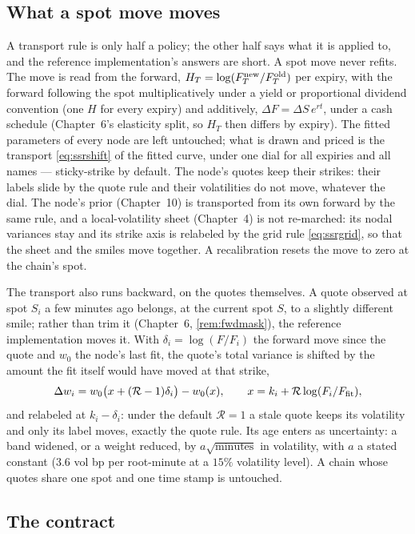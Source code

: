 \subsection{What a spot move moves}
\label{sec:ssrmoves}

A transport rule is only half a policy; the other half says what it
is applied to, and the reference implementation's answers are short.
A spot move never refits.  The move is read from the forward,
$H_T=\log(F_T^{\rm new}/F_T^{\rm old})$ per expiry, with the forward
following the spot multiplicatively under a yield or proportional
dividend convention (one $H$ for every expiry) and additively,
$\Delta F=\Delta S\,e^{rt}$, under a cash schedule (Chapter~6's
elasticity split, so $H_T$ then differs by expiry).  The fitted
parameters of every node are left untouched; what is drawn and
priced is the transport \eqref{eq:ssrshift} of the fitted curve,
under one dial for all expiries and all names --- sticky-strike by
default.  The node's quotes keep their strikes: their labels slide by
the quote rule and their volatilities do not move, whatever the dial.
The node's prior (Chapter~10) is transported from its own forward by
the same rule, and a local-volatility sheet (Chapter~4) is not
re-marched: its nodal variances stay and its strike axis is relabeled
by the grid rule \eqref{eq:ssrgrid}, so that the sheet and the smiles
move together.  A recalibration resets the move to zero at the
chain's spot.

The transport also runs backward, on the quotes themselves.  A quote
observed at spot $S_i$ a few minutes ago belongs, at the current spot
$S$, to a slightly different smile; rather than trim it
(Chapter~6, \cref{rem:fwdmask}), the reference implementation moves
it.  With $\delta_i=\log(F/F_i)$ the forward move since the quote and
$w_0$ the node's last fit, the quote's total variance is shifted by
the amount the fit itself would have moved at that strike,
\[
\Delta w_i=w_0\big(x+(\mathcal{R}-1)\delta_i\big)-w_0(x),
\qquad x=k_i+\mathcal{R}\log(F_i/F_{\rm fit}),
\]
and relabeled at $k_i-\delta_i$: under the default $\mathcal{R}=1$
a stale quote keeps its volatility and only its label moves, exactly
the quote rule.  Its age enters as uncertainty: a band widened, or a
weight reduced, by $a\sqrt{\text{minutes}}$ in volatility, with $a$
a stated constant ($3.6$ vol bp per root-minute at a $15\%$
volatility level).  A chain whose quotes share one spot and one time
stamp is untouched.

\subsection{The contract}
\label{sec:ssrcontract}

